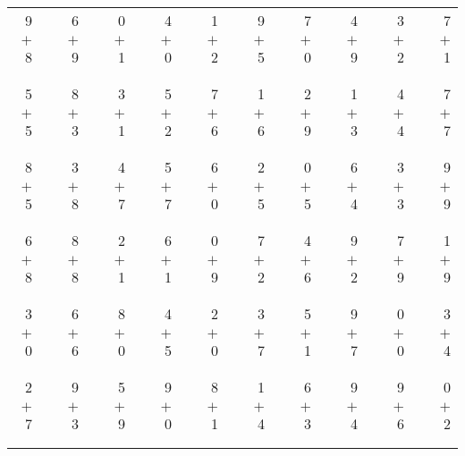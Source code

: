 \documentclass[12pt, letterpaper]{article}
\begin{document}
\begin{tabular}{rrrrrrrrrrrrrrrrrrr}
9 & & 6 & & 0 & & 4 & & 1 & & 9 & & 7 & & 4 & & 3 & & 7\\
$+$ 8 & & $+$ 9 & & $+$ 1 & & $+$ 0 & & $+$ 2 & & $+$ 5 & & $+$ 0 & & $+$ 9 & & $+$ 2 & & $+$ 1\\
\cline{1-1} \cline{3-3} \cline{5-5} \cline{7-7} \cline{9-9} \cline{11-11} \cline{13-13} \cline{15-15} \cline{17-17} \cline{19-19} \\ \\
5 & & 8 & & 3 & & 5 & & 7 & & 1 & & 2 & & 1 & & 4 & & 7\\
$+$ 5 & & $+$ 3 & & $+$ 1 & & $+$ 2 & & $+$ 6 & & $+$ 6 & & $+$ 9 & & $+$ 3 & & $+$ 4 & & $+$ 7\\
\cline{1-1} \cline{3-3} \cline{5-5} \cline{7-7} \cline{9-9} \cline{11-11} \cline{13-13} \cline{15-15} \cline{17-17} \cline{19-19} \\ \\
8 & & 3 & & 4 & & 5 & & 6 & & 2 & & 0 & & 6 & & 3 & & 9\\
$+$ 5 & & $+$ 8 & & $+$ 7 & & $+$ 7 & & $+$ 0 & & $+$ 5 & & $+$ 5 & & $+$ 4 & & $+$ 3 & & $+$ 9\\
\cline{1-1} \cline{3-3} \cline{5-5} \cline{7-7} \cline{9-9} \cline{11-11} \cline{13-13} \cline{15-15} \cline{17-17} \cline{19-19} \\ \\
6 & & 8 & & 2 & & 6 & & 0 & & 7 & & 4 & & 9 & & 7 & & 1\\
$+$ 8 & & $+$ 8 & & $+$ 1 & & $+$ 1 & & $+$ 9 & & $+$ 2 & & $+$ 6 & & $+$ 2 & & $+$ 9 & & $+$ 9\\
\cline{1-1} \cline{3-3} \cline{5-5} \cline{7-7} \cline{9-9} \cline{11-11} \cline{13-13} \cline{15-15} \cline{17-17} \cline{19-19} \\ \\
3 & & 6 & & 8 & & 4 & & 2 & & 3 & & 5 & & 9 & & 0 & & 3\\
$+$ 0 & & $+$ 6 & & $+$ 0 & & $+$ 5 & & $+$ 0 & & $+$ 7 & & $+$ 1 & & $+$ 7 & & $+$ 0 & & $+$ 4\\
\cline{1-1} \cline{3-3} \cline{5-5} \cline{7-7} \cline{9-9} \cline{11-11} \cline{13-13} \cline{15-15} \cline{17-17} \cline{19-19} \\ \\
2 & & 9 & & 5 & & 9 & & 8 & & 1 & & 6 & & 9 & & 9 & & 0\\
$+$ 7 & & $+$ 3 & & $+$ 9 & & $+$ 0 & & $+$ 1 & & $+$ 4 & & $+$ 3 & & $+$ 4 & & $+$ 6 & & $+$ 2\\
\cline{1-1} \cline{3-3} \cline{5-5} \cline{7-7} \cline{9-9} \cline{11-11} \cline{13-13} \cline{15-15} \cline{17-17} \cline{19-19} \\ \\

\end{tabular}
\end{document}
